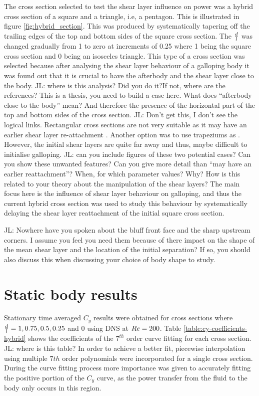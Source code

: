 The cross section selected to test the shear layer influence on power was a hybrid cross section of a square and a triangle, i.e, a pentagon. This is illustrated in figure \ref{fig:hybrid_section}. This was produced by systematically tapering off the trailing edges of the top and bottom sides of the square cross section. The $\frac{d}{l}$ was changed gradually from 1 to zero at increments of 0.25 where 1 being the square cross section and 0 being an isosceles triangle. This type of a cross section was selected because after analysing the shear layer behaviour of a galloping body it was found out that it is crucial to have the afterbody and the shear layer close to the body. JL: where is this analysis? Did you do it?If not, where are the references? This is a thesis, you need to build a case here. What does ``afterbody close to the body'' mean? And therefore the presence of the horizontal part of the top and bottom sides of the cross section. JL: Don't get this, I don't see the logical links. Rectangular cross sections are not very suitable as it may have an earlier shear layer re-attachment \citet{Paidoussis2010}. Another option was to use trapeziums as \citet{Luo1994}. However, the initial shear layers are quite far away and thus, maybe difficult to initialise galloping. JL: can you include figures of these two potential cases? Can you show these unwanted features? Can you give more detail than ``may have an earlier reattachment''? When, for which parameter values? Why? How is this related to your theory about the manipulation of the shear layers? The main focus here is the influence of shear layer behaviour on galloping, and thus the current hybrid cross section was used to study this behaviour by systematically delaying the shear layer reattachment of the initial square cross section.

JL: Nowhere have you spoken about the bluff front face and the sharp
upstream corners. I assume you feel you need them because of there
impact on the shape of the mean shear layer and the location of the
initial separation? If so, you should also discuss this when
discussing your choice of body shape to study.

\section{Static body results}
\label{sec:cross-sec-Static body results}



Stationary time averaged $C_y$ results were obtained for cross sections where $\frac{d}{l}=1,0.75,0.5,0.25$ and $0$ using DNS at $Re=200$. Table \ref{table:cy-coefficients-hybrid} shows the coefficients of the $7^{th}$ order curve fitting for each cross section. JL: where is this table? In order to achieve a better fit, piecewise interpolation using multiple $7th$ order polynomials were incorporated for a single cross section. During the curve fitting process more importance was given to accurately fitting the positive portion of the $C_{y}$ curve, as the power transfer from the fluid to the body only occurs in this region. 

